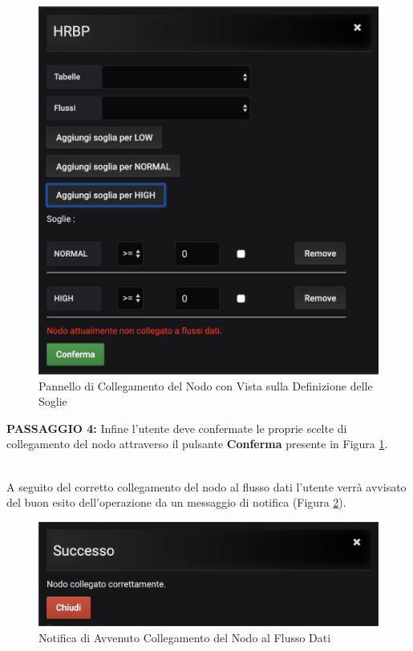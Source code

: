 \begin{figure}[H]
	\begin{center}
		\includegraphics[scale=0.55]{./images/PannelloSoglie.png}
		 \caption{Pannello di Collegamento del Nodo con Vista sulla Definizione delle Soglie}	
		 \label{PannelloSoglie}
	\end{center}
\end{figure}

\textbf{PASSAGGIO 4:} Infine l'utente deve confermate le proprie scelte di collegamento del nodo attraverso il pulsante \textbf{Conferma} presente in Figura \ref{PannelloSoglie}.

~\\
A seguito del corretto collegamento del nodo al flusso dati l'utente verrà avvisato del buon esito dell'operazione da un messaggio di notifica (Figura \ref{NotificaCollegamento}).

\begin{figure}[H]
	\begin{center}
		\includegraphics[scale=0.6]{./images/NotificaCollegamento.png}
		 \caption{Notifica di Avvenuto Collegamento del Nodo al Flusso Dati}	
		 \label{NotificaCollegamento}
	\end{center}
\end{figure}

